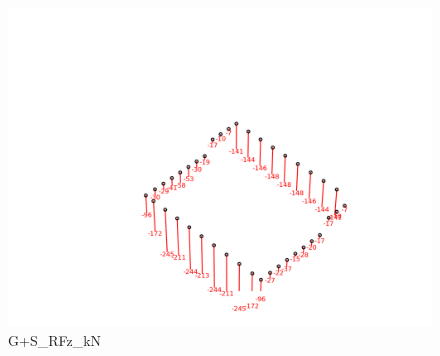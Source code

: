     \begin{figure}[H] %
        \centering %
        \includegraphics[width=\textwidth]{assets/img/graph3D_charges_cas_4_RFz_kN.png} %
        \caption{G+S\_RFz\_kN} %
    \end{figure}

    